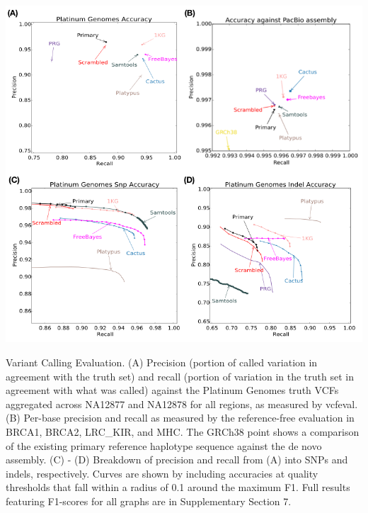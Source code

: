 \begin{FPfigure}
\centering
\includegraphics[width=\textwidth]{figures/04_bakeoff/figure04.png}
\caption[Variant calling evaluation]{Variant Calling Evaluation. (A) Precision (portion of called
variation in agreement with the truth set) and recall (portion of
variation in the truth set in agreement with what was called) against
the Platinum Genomes truth VCFs aggregated across NA12877 and NA12878
for all regions, as measured by vcfeval. (B) Per-base precision and
recall as measured by the reference-free evaluation in BRCA1, BRCA2,
LRC\_KIR, and MHC. The GRCh38 point shows a comparison of the existing
primary reference haplotype sequence against the de novo assembly. (C) -
(D) Breakdown of precision and recall from (A) into SNPs and indels,
respectively. Curves are shown by including accuracies at quality
thresholds that fall within a radius of 0.1 around the maximum F1. Full
results featuring F1-scores for all graphs are in Supplementary Section
7.}
\label{fig:bakeoff:callingeval}
\end{FPfigure}

